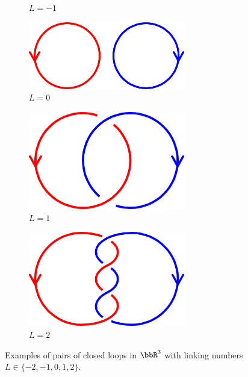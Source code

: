 \begin{figure}[!ht]
\begin{subfigure}{0.1811\textwidth}
            \caption{$L = -1$}
        \end{subfigure}%
        \begin{subfigure}{0.2634\textwidth}
            \centering
            \includegraphics[width = 0.75\textwidth]{2 - fluid component/1 - structures/2 - global/images/0.png}
            \caption{$L = 0$}
        \end{subfigure}%
        \begin{subfigure}{0.1815\textwidth}
            \centering
            \includegraphics[width = 0.75\textwidth]{2 - fluid component/1 - structures/2 - global/images/1.png}
            \caption{$L = 1$}
        \end{subfigure}%
        \begin{subfigure}{0.1872\textwidth}
            \centering
            \includegraphics[width = 0.75\textwidth]{2 - fluid component/1 - structures/2 - global/images/2.png}
            \caption{$L = 2$}
        \end{subfigure}
        \caption{Examples of pairs of closed loops in $\bbR^{3}$ with linking numbers $L  \in  \{-2, -1, 0, 1, 2\}$. }
        \label{fig:linking numbers}
    \end{figure}

